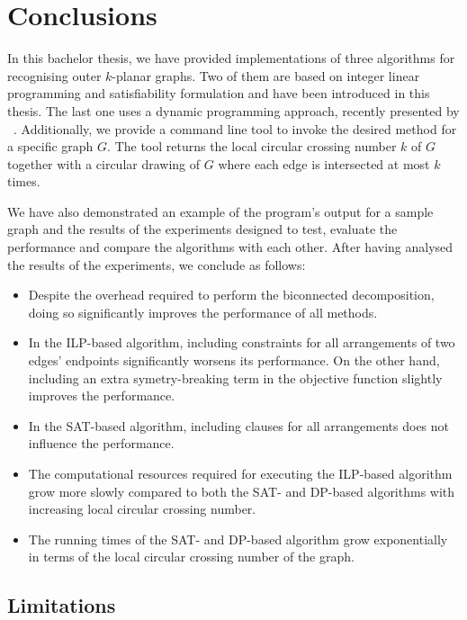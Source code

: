 \chapter{Conclusions}\label{ch:conclusions}

In this bachelor thesis, we have provided implementations of three algorithms for recognising outer \(k\)-planar graphs. Two of them are based on integer linear programming and satisfiability formulation and have been introduced in this thesis. The last one uses a dynamic programming approach, recently presented by \citeauthor{okp}~\cite{okp}. Additionally, we provide a command line tool to invoke the desired method for a specific graph \(G\). The tool returns the local circular crossing number \(k\) of \(G\) together with a circular drawing of \(G\) where each edge is intersected at most \(k\) times.

We have also demonstrated an example of the program's output for a sample graph and the results of the experiments designed to test, evaluate the performance and compare the algorithms with each other. After having analysed the results of the experiments, we conclude as follows:
\begin{itemize}
    \item Despite the overhead required to perform the biconnected decomposition, doing so significantly improves the performance of all methods.
    \item In the ILP-based algorithm, including constraints for all arrangements of two edges' endpoints significantly worsens its performance. On the other hand, including an extra symetry-breaking term in the objective function slightly improves the performance.
    \item In the SAT-based algorithm, including clauses for all arrangements does not influence the performance.
    \item The computational resources required for executing the ILP-based algorithm grow more slowly compared to both the SAT- and DP-based algorithms with increasing local circular crossing number.
    \item The running times of the SAT- and DP-based algorithm grow
    exponentially in terms of the local circular crossing number of the graph.
\end{itemize}

\section{Limitations}

